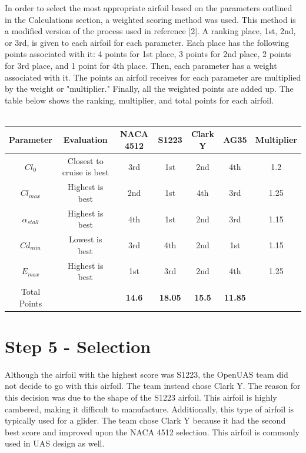 \documentclass{article}
\begin{document}
In order to select the most appropriate airfoil based on the parameters outlined in the Calculations section, a weighted scoring method was used. This method is a modified version of the process used in reference [2]. A ranking place, 1st, 2nd, or 3rd, is given to each airfoil for each parameter. Each place has the following points associated with it: 4 points for 1st place, 3 points for 2nd place, 2 points for 3rd place, and 1 point for 4th place. Then, each parameter has a weight associated with it. The points an airfoil receives for each parameter are multiplied by the weight or "multiplier." Finally, all the weighted points are added up. The table below shows the ranking, multiplier, and total points for each airfoil. \\ \\

\begin{tabular}[pos]{| c | c | c | c | c | c | c |}
\hline
Parameter & Evaluation & NACA 4512 & S1223 & Clark Y & AG35 & Multiplier \\ \hline
$Cl_{0}$ & Closest to cruise is best & 3rd & 1st & 2nd & 4th & 1.2  \\ \hline
$Cl_{max}$ & Highest is best & 2nd & 1st & 4th & 3rd & 1.25 \\ \hline
$\alpha_{stall}$ & Highest is best & 4th & 1st & 2nd & 3rd & 1.15 \\ \hline
$Cd_{min}$ & Lowest is best & 3rd & 4th & 2nd & 1st & 1.15 \\ \hline
$E_{max}$ & Highest is best & 1st & 3rd & 2nd & 4th & 1.25  \\ \hline
Total Points & & \textbf{14.6} & \textbf{18.05} & \textbf{15.5} & \textbf{11.85} & \\ \hline
\end{tabular}


\section*{Step 5 - Selection}
Although the airfoil with the highest score was S1223, the OpenUAS team did not decide to go with this airfoil. The team instead chose Clark Y. The reason for this decision was due to the shape of the S1223 airfoil. This airfoil is highly cambered, making it difficult to manufacture. Additionally, this type of airfoil is typically used for a glider. The team chose Clark Y because it had the second best score and improved upon the NACA 4512 selection. This airfoil is commonly used in UAS design as well. 
\end{document}
